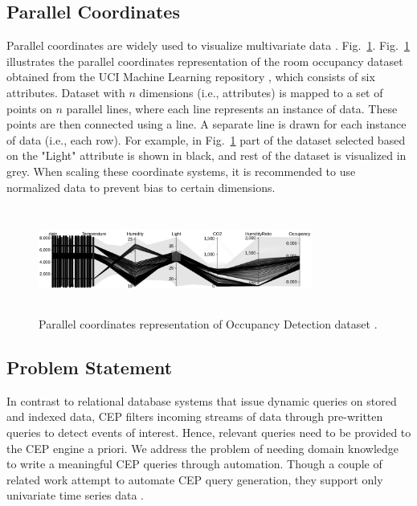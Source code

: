 \documentclass[conference]{IEEEtran}  %
\begin{document}
\subsection{Parallel Coordinates}
Parallel coordinates are widely used to visualize multivariate data \cite{IEEEexample:ParallelCoordinates}. Fig.~\ref{fig:parallcor}. Fig.~\ref{fig:parallcor} illustrates the parallel coordinates representation of the room occupancy dataset obtained from the UCI Machine Learning repository \cite{IEEEexample:Ocupancy}, which consists of six attributes. Dataset with $n$ dimensions (i.e., attributes) is mapped to a set of points on $n$ parallel lines, where each line represents an instance of data. These points are then connected using a line. A separate line is drawn for each instance of data (i.e., each row). For example, in Fig.~\ref{fig:parallcor} part of the dataset selected based on the "Light" attribute is shown in black, and rest of the dataset is visualized in grey. When scaling these coordinate systems, it is recommended to use normalized data to prevent bias to certain dimensions.

\begin{figure}
\includegraphics[width=9cm,height=3.5cm]{occupancy_d3.png}
\caption{Parallel coordinates representation of Occupancy Detection dataset \cite{IEEEexample:Ocupancy}.}
\label{fig:parallcor}
\squeezeup
\end{figure}


\subsection{Problem Statement} 
In contrast to relational database systems that issue dynamic queries on stored and indexed data, CEP filters incoming streams of data through pre-written queries to detect events of interest. Hence, relevant queries need to be provided to the CEP engine a priori. We address the problem of needing domain knowledge to write a meaningful CEP queries through automation. Though a couple of related work attempt to automate CEP query generation, they support only univariate time series data \cite{IEEEexample:autoCEP}.
\end{document}
